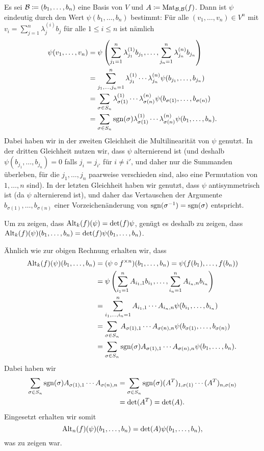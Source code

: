 \documentclass[a4paper,10pt]{article}
\begin{document}
Es sei $\mathcal{B} \coloneqq (b_1, \dotsc, b_n)$ eine Basis von $V$ und $A \coloneqq \mathrm{Mat}_{\mathcal{B},\mathcal{B}}(f)$. Dann ist $\psi$ eindeutig durch den Wert $\psi(b_1, \dotsc, b_n)$ bestimmt: Für alle $(v_1, \dotsc, v_n) \in V^n$ mit $v_i = \sum_{j=1}^n \lambda^{(i)}_j b_j$ für alle $1 \leq i \leq n$ ist nämlich
\begin{align*}
 \psi(v_1, \dotsc, v_n)
 &= \psi\left( \sum_{{j_1}=1}^n \lambda^{(1)}_{j_1} b_{j_1}, \dotsc, \sum_{{j_n}=1}^n \lambda^{(n)}_{j_n} b_{j_n} \right) \\
 &= \sum_{j_1, \dotsc, j_n = 1}^n \lambda^{(1)}_{j_1} \dotsm \lambda^{(n)}_{j_n} \psi(b_{j_1}, \dotsc, b_{j_n}) \\
 &= \sum_{\sigma \in S_n} \lambda^{(1)}_{\sigma(1)} \dotsm \lambda^{(n)}_{\sigma(n)} \psi(b_{\sigma(1)}, \dotsc, b_{\sigma(n)}) \\
 &= \sum_{\sigma \in S_n} \operatorname{sgn}(\sigma) \lambda^{(1)}_{\sigma(1)} \dotsm \lambda^{(n)}_{\sigma(n)} \psi(b_1, \dotsc, b_n).
\end{align*}
Dabei haben wir in der zweiten Gleichheit die Multilinearität von $\psi$ genutzt. In der dritten Gleichheit nutzen wir, dass $\psi$ alternierend ist (und deshalb $\psi(b_{j_1}, \dotsc, b_{j_n}) = 0$ falls $j_i = j_{i'}$ für $i \neq i'$, und daher nur die Summanden überleben, für die $j_1, \dotsc, j_n$ paarweise verschieden sind, also eine Permutation von $1, \dotsc, n$ sind). In der letzten Gleichheit haben wir genutzt, dass $\psi$ antisymmetrisch ist (da $\psi$ alternierend ist), und daher das Vertauschen der Argumente $b_{\sigma(1)}, \dotsc, b_{\sigma(n)}$ einer Vorzeichenänderung von $\operatorname{sgn}(\sigma^{-1}) = \operatorname{sgn}(\sigma)$ entspricht.

Um zu zeigen, dass $\mathrm{Alt}_k(f)(\psi) = \det(f) \psi$, genügt es deshalb zu zeigen, dass $\mathrm{Alt}_k(f)(\psi)(b_1, \dotsc, b_n) = \det(f) \psi(b_1, \dotsc, b_n)$.

Ähnlich wie zur obigen Rechnung erhalten wir, dass
\begin{align*}
 \mathrm{Alt}_k(f)(\psi)(b_1, \dotsc, b_n)
 &= (\psi \circ f^{\times n})(b_1, \dotsc, b_n)
 = \psi(f(b_1), \dotsc, f(b_n)) \\
 &= \psi\left( \sum_{i_1 = 1}^n A_{i_1,1} b_{i_1}, \dotsc, \sum_{i_n = 1}^n A_{i_n,n} b_{i_n} \right) \\
 &= \sum_{i_1, \dotsc, i_n = 1}^n A_{i_1,1} \dotsm A_{i_n,n} \psi(b_{i_1}, \dotsc, b_{i_n}) \\
 &= \sum_{\sigma \in S_n} A_{\sigma(1),1} \dotsm A_{\sigma(n),n} \psi(b_{\sigma(1)}, \dotsc, b_{\sigma(n)}) \\
 &= \sum_{\sigma \in S_n} \operatorname{sgn}(\sigma) A_{\sigma(1),1} \dotsm A_{\sigma(n),n} \psi(b_1, \dotsc, b_n).
\end{align*}
Dabei haben wir
\begin{align*}
 \sum_{\sigma \in S_n} \operatorname{sgn}(\sigma) A_{\sigma(1),1} \dotsm A_{\sigma(n),n}
 &= \sum_{\sigma \in S_n} \operatorname{sgn}(\sigma) (A^T)_{1,\sigma(1)} \dotsm (A^T)_{n,\sigma(n)} \\
 &= \det(A^T)
 = \det(A).
\end{align*}
Eingesetzt erhalten wir somit
\[
 \mathrm{Alt}_n(f)(\psi)(b_1, \dotsc, b_n)
 = \det(A) \psi(b_1, \dotsc, b_n),
\]
was zu zeigen war.
\end{document}
